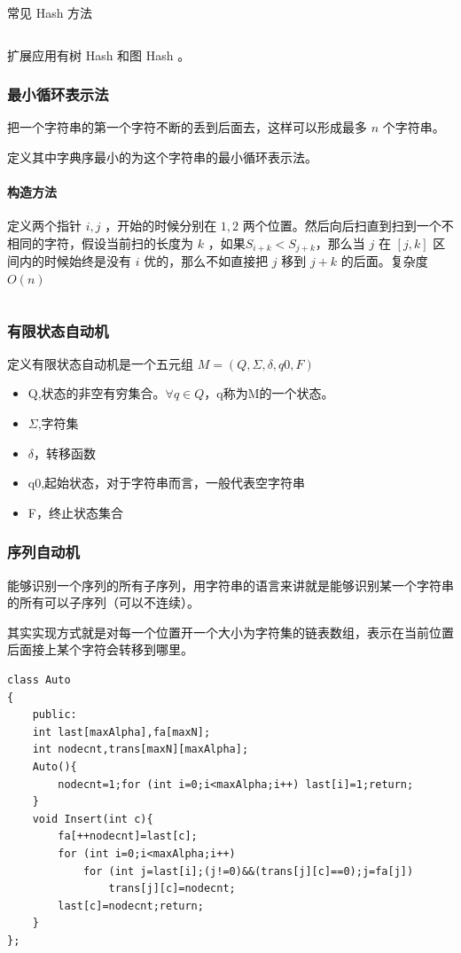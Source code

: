 \documentclass[UTF-8]{ctexart}
\newcommand{\cpp}[1]{\inputminted[bgcolor=bg,breaklines,breakanywhere=true]{c++}{#1}}
\begin{document}
			常见 Hash 方法
			\cpp{code//String//hash.cpp}
			扩展应用有树 Hash 和图 Hash 。
			\subsubsection{最小循环表示法}
			把一个字符串的第一个字符不断的丢到后面去，这样可以形成最多 $n$ 个字符串。
			
			定义其中字典序最小的为这个字符串的最小循环表示法。
			
			\paragraph{构造方法} 定义两个指针 $i,j$ ，开始的时候分别在 $1,2$ 两个位置。然后向后扫直到扫到一个不相同的字符，假设当前扫的长度为 $k$ ，如果$S_{i+k} < S_{j+k}$，那么当 $j$ 在 $[j,k]$ 区间内的时候始终是没有 $i$ 优的，那么不如直接把 $j$ 移到 $j+k$ 的后面。复杂度 $O(n)$
			\cpp{code//String//minre.cpp}
	\subsubsection{有限状态自动机}
	定义有限状态自动机是一个五元组 $M=(Q, \Sigma, \delta, q0, F)$
	
	\begin{itemize}
		\item Q,状态的非空有穷集合。$\forall q \in Q$，q称为M的一个状态。
		\item $\Sigma$,字符集
		\item $\delta$，转移函数
		\item q0,起始状态，对于字符串而言，一般代表空字符串
		\item F，终止状态集合
	\end{itemize}
	
	\subsubsection{序列自动机}
	能够识别一个序列的所有子序列，用字符串的语言来讲就是能够识别某一个字符串的所有可以子序列（可以不连续）。
	
	其实实现方式就是对每一个位置开一个大小为字符集的链表数组，表示在当前位置后面接上某个字符会转移到哪里。
\begin{verbatim}
class Auto
{
    public:
    int last[maxAlpha],fa[maxN];
    int nodecnt,trans[maxN][maxAlpha];
    Auto(){
        nodecnt=1;for (int i=0;i<maxAlpha;i++) last[i]=1;return;
    }
    void Insert(int c){
        fa[++nodecnt]=last[c];
        for (int i=0;i<maxAlpha;i++)
            for (int j=last[i];(j!=0)&&(trans[j][c]==0);j=fa[j])
                trans[j][c]=nodecnt;
        last[c]=nodecnt;return;
    }
};
\end{verbatim}
\end{document}
